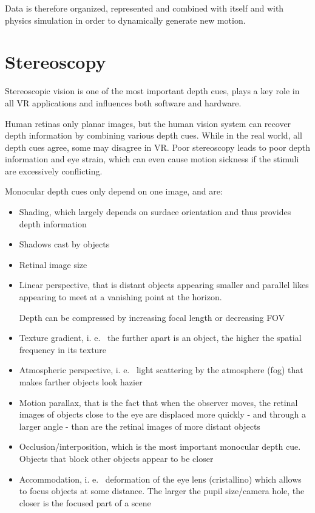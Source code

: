 \documentclass[a4paper]{article}
\begin{document}
Data is therefore organized, represented and combined with itself and
with physics simulation in order to dynamically generate new motion.

\section{Stereoscopy}

Stereoscopic vision is one of the most important depth cues, plays a key
role in all VR applications and influences both software and hardware.

Human retinas only planar images, but the human vision system can
recover depth information by combining various depth cues.
While in the
real world, all depth cues agree, some may disagree in VR.
Poor
stereoscopy leads to poor depth information and eye strain, which can
even cause motion sickness if the stimuli are excessively conflicting.

Monocular depth cues only depend on one image, and are:

\begin{itemize}

\item
  Shading, which largely depends on surdace orientation and thus
  provides depth information
\item
  Shadows cast by objects
\item
  Retinal image size
\item
  Linear perspective, that is distant objects appearing smaller and
  parallel likes appearing to meet at a vanishing point at the horizon.

  Depth can be compressed by increasing focal length or decreasing FOV
\item
  Texture gradient, i.
e.
~the further apart is an object, the higher the
  spatial frequency in its texture
\item
  Atmospheric perspective, i.
e.
~light scattering by the atmosphere (fog)
  that makes farther objects look hazier
\item
  Motion parallax, that is the fact that when the observer moves, the
  retinal images of objects close to the eye are displaced more quickly
  - and through a larger angle - than are the retinal images of more
  distant objects
\item
  Occlusion/interposition, which is the most important monocular depth
  cue.
Objects that block other objects appear to be closer
\item
  Accommodation, i.
e.
~deformation of the eye lens (cristallino) which
  allows to focus objects at some distance.
The larger the pupil
  size/camera hole, the closer is the focused part of a scene
\end{itemize}
\end{document}
